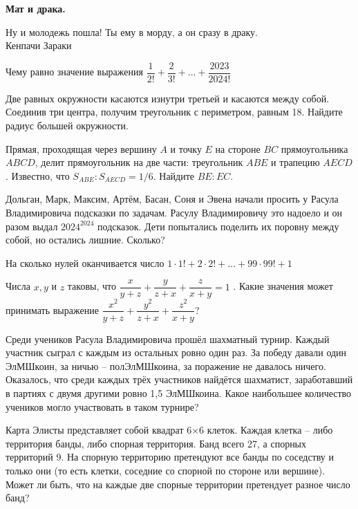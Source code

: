 \centerline{\bf \Huge Мат и драка.}

\begin{flushright}
        \scriptsize{Ну и молодежь пошла! Ты ему в морду, а он сразу в драку.\\Кенпачи Зараки}
\end{flushright}

Чему равно значение выражения $\dfrac{1}{2!} + \dfrac{2}{3!} + \ldots + \dfrac{2023}{2024!}$

Две равных окружности касаются изнутри третьей и касаются между собой. Соединив три центра, получим треугольник с периметром, равным 18. Найдите радиус большей окружности.


Прямая, проходящая через вершину $A$ и точку $E$ на стороне $BC$ прямоугольника $ABCD$, делит прямоугольник на две части: треугольник $ABE$ и трапецию $AECD$. Известно, что $S_{ABE} : S_{AECD} = 1/6$. Найдите $BE : EC.$

Дольган, Марк, Максим, Артём, Басан, Соня и Эвена начали просить у Расула Владимировича подсказки по задачам. Расулу Владимировичу это надоело и он разом выдал $2024^{2024}$ подсказок. Дети попытались поделить их поровну между собой, но остались лишние. Сколько? 

На сколько нулей оканчивается число $1\cdot1! + 2\cdot2! + \ldots + 99\cdot99! + 1$

Числа $x, y$ и $z$ таковы, что $\dfrac{x}{y+z} + \dfrac{y}{z+x} + \dfrac{z}{x+y} = 1$ .  Какие значения может принимать выражение  $\dfrac{x^2}{y+z} + \dfrac{y^2}{z+x} + \dfrac{z^2}{x+y}$?

Среди учеников Расула Владимировича прошёл шахматный турнир. Каждый участник сыграл с каждым из остальных ровно один раз. За победу давали один ЭлМШкоин, за ничью – полЭлМШкоина, за поражение не давалось ничего. Оказалось, что среди каждых трёх участников найдётся шахматист, заработавший в партиях с двумя другими ровно 1,5 ЭлМШкоина. Какое наибольшее количество учеников могло участвовать в таком турнире?

Карта Элисты представляет собой квадрат 6×6 клеток. Каждая клетка – либо территория банды, либо спорная территория. Банд всего 27, а спорных территорий 9. На спорную территорию претендуют все банды по соседству и только они (то есть клетки, соседние со спорной по стороне или вершине). Может ли быть, что на каждые две спорные территории претендует разное число банд?


\newpage

